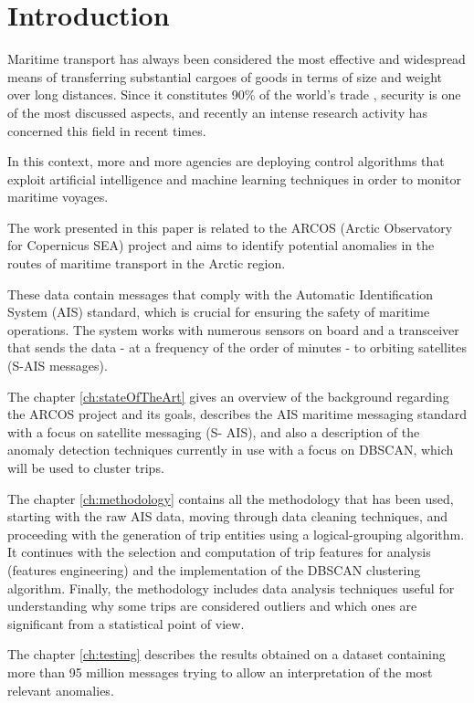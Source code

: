 \chapter*{Introduction}
\label{ch:introduction}

Maritime transport has always been considered the most effective and widespread means of transferring substantial cargoes of goods in terms of size and weight over long distances. Since it constitutes 90\% of the world's trade \cite{trasporto_marittimo}, security is one of the most discussed aspects, and recently an intense research activity has concerned this field in recent times. 

In this context, more and more agencies are deploying control algorithms that exploit artificial intelligence and machine learning techniques in order to monitor maritime voyages.

The work presented in this paper is related to the ARCOS (Arctic Observatory for Copernicus SEA) project and aims to identify potential anomalies in the routes of maritime transport in the Arctic region.

These data contain messages that comply with the Automatic Identification System (AIS) standard, which is crucial for ensuring the safety of maritime operations. The system works with numerous sensors on board and a transceiver that sends the data - at a frequency of the order of minutes - to orbiting satellites (S-AIS messages).

The chapter \ref{ch:stateOfTheArt} gives an overview of the background regarding the ARCOS project and its goals, describes the AIS maritime messaging standard with a focus on satellite messaging (S- AIS), and also a description of the anomaly detection techniques currently in use with a focus on DBSCAN, which will be used to cluster trips.

The chapter \ref{ch:methodology} contains all the methodology that has been used, starting with the raw AIS data, moving through data cleaning techniques, and proceeding with the generation of trip entities using a logical-grouping algorithm. It continues with the selection and computation of trip features for analysis (features engineering) and the implementation of the DBSCAN clustering algorithm. Finally, the methodology includes data analysis techniques useful for understanding why some trips are considered outliers and which ones are significant from a statistical point of view.

The chapter \ref{ch:testing} describes the results obtained on a dataset containing more than 95 million messages trying to allow an interpretation of the most relevant anomalies.